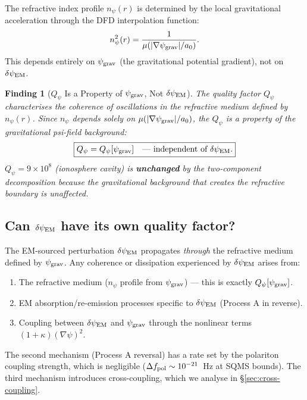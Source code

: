 \documentclass[11pt]{article}
\newtheorem{finding}{Finding}
\newcommand{\ee}[1]{\times 10^{#1}}
\newcommand{\psigrav}{\psi_{\rm grav}}
\newcommand{\dpsiEM}{\delta\psi_{\rm EM}}
\newcommand{\Qpsi}{Q_\psi}
\newcommand{\npsi}{n_\psi}
\newcommand{\mufd}{\mu}
\begin{document}
The refractive index profile $\npsi(r)$ is determined by the local
gravitational acceleration through the DFD interpolation function:
\begin{equation}
\npsi^2(r) = \frac{1}{\mufd(|\nabla\psigrav|/a_0)}.
\label{eq:npsi-from-mu}
\end{equation}
This depends entirely on $\psigrav$ (the gravitational potential gradient),
not on $\dpsiEM$.

\begin{finding}[$\Qpsi$ Is a Property of $\psigrav$, Not $\dpsiEM$]
\label{find:Qpsi-grav}
The quality factor $\Qpsi$ characterises the coherence of oscillations in
the refractive medium defined by $\npsi(r)$. Since $\npsi$ depends solely
on $\mufd(|\nabla\psigrav|/a_0)$, the $\Qpsi$ is a property of the
\emph{gravitational} psi-field background:
\begin{equation}
\boxed{\Qpsi = \Qpsi[\psigrav] \quad\text{--- independent of }\dpsiEM.}
\end{equation}
$\Qpsi = 9\ee{8}$ (ionosphere cavity) is \textbf{unchanged} by the
two-component decomposition because the gravitational background that
creates the refractive boundary is unaffected.
\end{finding}

\subsection{Can $\dpsiEM$ have its own quality factor?}

The EM-sourced perturbation $\dpsiEM$ propagates \emph{through} the
refractive medium defined by $\psigrav$. Any coherence or dissipation
experienced by $\dpsiEM$ arises from:
\begin{enumerate}
  \item The refractive medium ($\npsi$ profile from $\psigrav$) --- this is
    exactly $\Qpsi[\psigrav]$.
  \item EM absorption/re-emission processes specific to $\dpsiEM$ (Process A
    in reverse).
  \item Coupling between $\dpsiEM$ and $\psigrav$ through the nonlinear
    terms $(1+\kappa)(\nabla\psi)^2$.
\end{enumerate}

The second mechanism (Process A reversal) has a rate set by the polariton
coupling strength, which is negligible ($\Delta f_{\rm pol} \sim 10^{-21}$~Hz
at SQMS bounds). The third mechanism introduces cross-coupling, which we
analyse in \S\ref{sec:cross-coupling}.
\end{document}
